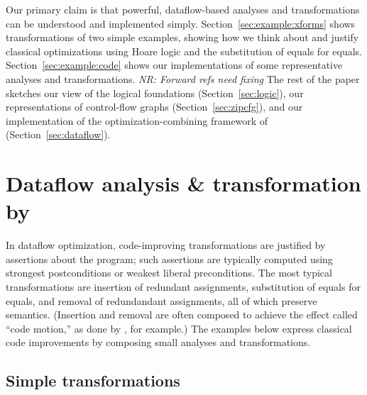 \documentclass[blockstyle,preprint,nocopyrightspace]{sigplanconf}
\let\cite\citep
\newcommand{\authornote}[1]{{\em #1}}
\newcommand{\norman}[1]{\authornote{NR: #1}}
\let\remark\norman
\newcommand\secref[1]{Section~\ref{sec:#1}}
\newcommand\seclabel[1]{\label{sec:#1}}
\begin{document}
Our primary
claim is that powerful, dataflow-based analyses and transformations can
be understood and implemented simply.
\secref{example:xforms} shows transformations of two simple examples,
showing how we think about and justify classical optimizations using
Hoare logic and the substitution of equals for equals.
\secref{example:code} shows our implementations of some representative analyses
and transformations.
\remark{Forward refs need fixing}
The rest of the paper sketches 
our view of the logical foundations (\secref{logic}), 
our representations of control-flow graphs (\secref{zipcfg}),
and our implementation of the optimization-combining framework of
\citet{lerner-grove-chambers:2002} (\secref{dataflow}).
%



\section{Dataflow analysis {\&} transformation by }

\seclabel{example:transforms}
\seclabel{example:xforms}

In dataflow optimization, code-improving transformations are justified
by assertions about the program;
such assertions are typically computed using
strongest postconditions or weakest liberal preconditions.
The most typical transformations are
insertion of redundant assignments,
substitution of
equals for equals, 
and
removal of redundandant assignments,
all of which preserve semantics.
(Insertion and removal are often composed to achieve the effect called
``code motion,'' as done by \cite{knoop:lazy-code-motion}, for example.) 
The examples below express classical code
improvements by composing small analyses and transformations.



\newcommand\exampletransform{\subsection}


\exampletransform{Simple transformations}

\seclabel{constant-propagation}
\end{document}
